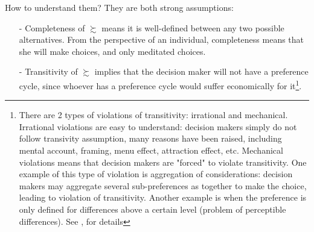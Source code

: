 How to understand them? They are both strong assumptions:
\begin{enumerate}
    \item[-] Completeness of $\succsim$ means it is well-defined between any two possible alternatives. From the perspective of an individual, completeness means that she will make choices, and only meditated choices.
    \item[-] Transitivity of $\succsim$ implies that the decision maker will not have a preference cycle, since whoever has a preference cycle would suffer economically for it\footnote{There are 2 types of violations of 
    transitivity: irrational and mechanical. Irrational violations are easy to understand: decision makers simply do not follow transivity assumption, many reasons have been raised, including mental account, framing, menu effect, attraction effect, etc. Mechanical violations means that decision makers are "forced" to violate transitivity. One 
    example of this type of violation is aggregation of considerations: decision makers may aggregate several sub-preferences as together to make the choice, leading to violation of transitivity. Another example is when the preference
    is only defined for differences above a certain level (problem of perceptible differences). See \citet[Page 7-8]{mas1995microeconomic}, \citet[Page 4-5]{ariel2012lecture} for details}.   
\end{enumerate}

